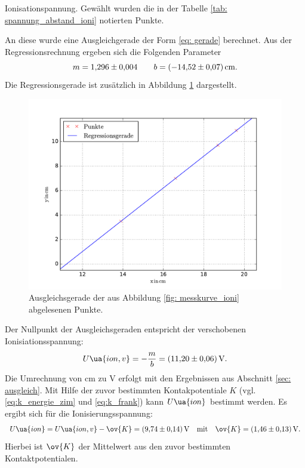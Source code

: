 Ionisationspannung.
Gewählt wurden die in der Tabelle \ref{tab: spannung_abstand_ioni} notierten Punkte.

An diese wurde eine Ausgleichgerade der Form \eqref{eq: gerade} berechnet.
Aus der Regressionsrechnung ergeben sich die Folgenden Parameter
\begin{equation*}
  m=\num{1.296\pm0.004} \qquad b=\SI{-14.52\pm0.07}{\centi\meter}.
\end{equation*}
Die Regressionsgerade ist zusätzlich in Abbildung \ref{fig: ioni_fit} dargestellt.
\begin{figure}
  \centering
  \includegraphics[width=0.8 \textwidth]{../Messdaten/gerade_io_final.pdf}
  \caption{Ausgleichsgerade der aus Abbildung \ref{fig: messkurve_ioni} abgelesenen Punkte.}
  \label{fig: ioni_fit}
\end{figure}
Der Nullpunkt der Ausgleichsgeraden entspricht der verschobenen
Ionisiationsspannung:
\begin{equation*}
  U\ua{ion,v}=-\frac{m}{b}=\SI{11.20\pm0.06}{\volt}.
\end{equation*}
Die Umrechnung von $\si{\centi\meter}$ zu $\si{\volt}$ erfolgt mit den Ergebnissen aus
Abschnitt \ref{sec: ausgleich}.
Mit Hilfe der zuvor bestimmten Kontakpotentiale $K$ (vgl. \eqref{eq:k_energie_zim} und \eqref{eq:k_frank})
kann $U\ua{ion}$ bestimmt werden. Es ergibt sich für die Ionisierungsspannung:
\begin{equation}
  \label{eq: u_ion}
  U\ua{ion}= U\ua{ion,v}-\ov{K}=\SI{9.74\pm0.14}{\volt} \quad \text{mit} \quad \ov{K}=\SI{1.46\pm0.13}{\volt}.
\end{equation}
Hierbei ist $\ov{K}$ der Mittelwert aus den zuvor bestimmten Kontaktpotentialen.
\FloatBarrier
